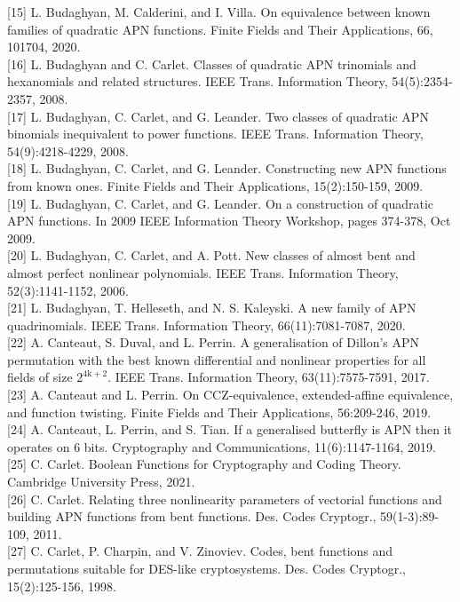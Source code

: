 \documentclass[10pt]{article}
\begin{document}
[15] L. Budaghyan, M. Calderini, and I. Villa. On equivalence between known families of quadratic APN functions. Finite Fields and Their Applications, 66, 101704, 2020.\\[0pt]
[16] L. Budaghyan and C. Carlet. Classes of quadratic APN trinomials and hexanomials and related structures. IEEE Trans. Information Theory, 54(5):2354-2357, 2008.\\[0pt]
[17] L. Budaghyan, C. Carlet, and G. Leander. Two classes of quadratic APN binomials inequivalent to power functions. IEEE Trans. Information Theory, 54(9):4218-4229, 2008.\\[0pt]
[18] L. Budaghyan, C. Carlet, and G. Leander. Constructing new APN functions from known ones. Finite Fields and Their Applications, 15(2):150-159, 2009.\\[0pt]
[19] L. Budaghyan, C. Carlet, and G. Leander. On a construction of quadratic APN functions. In 2009 IEEE Information Theory Workshop, pages 374-378, Oct 2009.\\[0pt]
[20] L. Budaghyan, C. Carlet, and A. Pott. New classes of almost bent and almost perfect nonlinear polynomials. IEEE Trans. Information Theory, 52(3):1141-1152, 2006.\\[0pt]
[21] L. Budaghyan, T. Helleseth, and N. S. Kaleyski. A new family of APN quadrinomials. IEEE Trans. Information Theory, 66(11):7081-7087, 2020.\\[0pt]
[22] A. Canteaut, S. Duval, and L. Perrin. A generalisation of Dillon's APN permutation with the best known differential and nonlinear properties for all fields of size $2^{4 \mathrm{k}+2}$. IEEE Trans. Information Theory, 63(11):7575-7591, 2017.\\[0pt]
[23] A. Canteaut and L. Perrin. On CCZ-equivalence, extended-affine equivalence, and function twisting. Finite Fields and Their Applications, 56:209-246, 2019.\\[0pt]
[24] A. Canteaut, L. Perrin, and S. Tian. If a generalised butterfly is APN then it operates on 6 bits. Cryptography and Communications, 11(6):1147-1164, 2019.\\[0pt]
[25] C. Carlet. Boolean Functions for Cryptography and Coding Theory. Cambridge University Press, 2021.\\[0pt]
[26] C. Carlet. Relating three nonlinearity parameters of vectorial functions and building APN functions from bent functions. Des. Codes Cryptogr., 59(1-3):89-109, 2011.\\[0pt]
[27] C. Carlet, P. Charpin, and V. Zinoviev. Codes, bent functions and permutations suitable for DES-like cryptosystems. Des. Codes Cryptogr., 15(2):125-156, 1998.\\[0pt]
\end{document}
